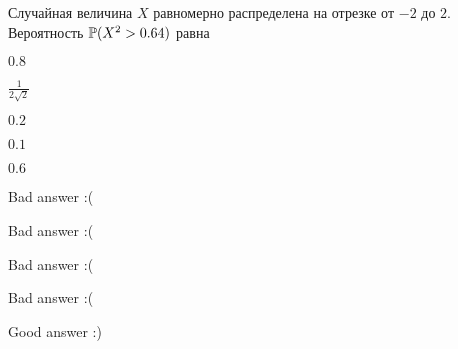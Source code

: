 
\begin{question}
Случайная величина \(X\) равномерно распределена на отрезке от \(-2\) до
\(2\). Вероятность \(\P(X^2>0.64)\) равна
\begin{answerlist}
  \item \(0.8\)
  \item \(\frac{1}{2\sqrt{2}}\)
  \item \(0.2\)
  \item \(0.1\)
  \item \(0.6\)
\end{answerlist}
\end{question}

\begin{solution}
\begin{answerlist}
  \item Bad answer :(
  \item Bad answer :(
  \item Bad answer :(
  \item Bad answer :(
  \item Good answer :)
\end{answerlist}
\end{solution}

